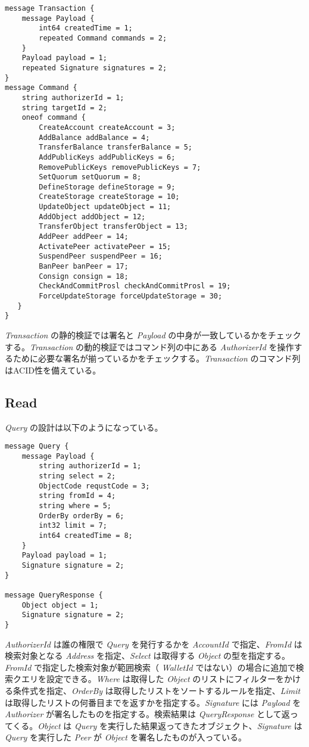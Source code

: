 \begin{verbatim}
message Transaction {
    message Payload {
        int64 createdTime = 1;
        repeated Command commands = 2;
    }
    Payload payload = 1;
    repeated Signature signatures = 2;
}
message Command {
    string authorizerId = 1;
    string targetId = 2;
    oneof command {
        CreateAccount createAccount = 3;
        AddBalance addBalance = 4;
        TransferBalance transferBalance = 5;
        AddPublicKeys addPublicKeys = 6;
        RemovePublicKeys removePublicKeys = 7;
        SetQuorum setQuorum = 8;
        DefineStorage defineStorage = 9;
        CreateStorage createStorage = 10;
        UpdateObject updateObject = 11;
        AddObject addObject = 12;
        TransferObject transferObject = 13;
        AddPeer addPeer = 14;
        ActivatePeer activatePeer = 15;
        SuspendPeer suspendPeer = 16;
        BanPeer banPeer = 17;
        Consign consign = 18;
        CheckAndCommitProsl checkAndCommitProsl = 19;
        ForceUpdateStorage forceUpdateStorage = 30;
   }
}
\end{verbatim}

\emph{Transaction} の静的検証では署名と \emph{Payload}
の中身が一致しているかをチェックする。\emph{Transaction}
の動的検証ではコマンド列の中にある \emph{AuthorizerId}
を操作するために必要な署名が揃っているかをチェックする。\emph{Transaction}
のコマンド列はACID性を備えている。

\hypertarget{read}{%
\subsection{Read}\label{read}}

\emph{Query} の設計は以下のようになっている。

\begin{verbatim}
message Query {
    message Payload {
        string authorizerId = 1;
        string select = 2;
        ObjectCode requstCode = 3;
        string fromId = 4;
        string where = 5;
        OrderBy orderBy = 6;
        int32 limit = 7;
        int64 createdTime = 8;
    }
    Payload payload = 1;
    Signature signature = 2;
}

message QueryResponse {
    Object object = 1;
    Signature signature = 2;
}
\end{verbatim}

\emph{AuthorizerId} は誰の権限で \emph{Query} を発行するかを
\emph{AccountId} で指定、\emph{FromId} は検索対象となる \emph{Address}
を指定、\emph{Select} は取得する \emph{Object}
の型を指定する。\emph{FromId} で指定した検索対象が範囲検索（
\emph{WalletId}
ではない）の場合に追加で検索クエリを設定できる。\emph{Where} は取得した
\emph{Object} のリストにフィルターをかける条件式を指定、\emph{OrderBy}
は取得したリストをソートするルールを指定、\emph{Limit}
は取得したリストの何番目までを返すかを指定する。\emph{Signature} には
\emph{Payload} を \emph{Authorizer} が署名したものを指定する。検索結果は
\emph{QueryResponse} として返ってくる。\emph{Object} は \emph{Query}
を実行した結果返ってきたオブジェクト、\emph{Signature} は \emph{Query}
を実行した \emph{Peer} が \emph{Object} を署名したものが入っている。

